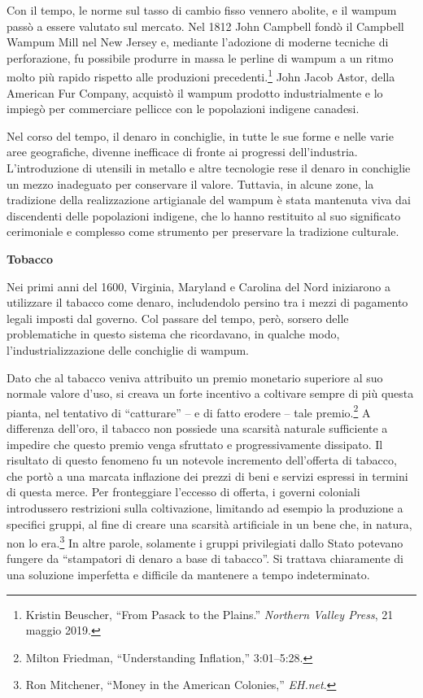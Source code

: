 \documentclass[
  a5paper,
  smalldemyvopaper,10pt,twoside,onecolumn,openright,extrafontsizes,hidelinks]{memoir}
\begin{document}
Con il tempo, le norme sul tasso di cambio fisso vennero abolite, e il
wampum passò a essere valutato sul mercato. Nel 1812 John Campbell fondò
il Campbell Wampum Mill nel New Jersey e, mediante l'adozione di moderne
tecniche di perforazione, fu possibile produrre in massa le perline di
wampum a un ritmo molto più rapido rispetto alle produzioni
precedenti.\footnote{Kristin Beuscher, ``From Pasack to the Plains.''
  \emph{Northern Valley Press}, 21 maggio 2019.} John Jacob Astor, della
American Fur Company, acquistò il wampum prodotto industrialmente e lo
impiegò per commerciare pellicce con le popolazioni indigene canadesi.

Nel corso del tempo, il denaro in conchiglie, in tutte le sue forme e
nelle varie aree geografiche, divenne inefficace di fronte ai progressi
dell'industria. L'introduzione di utensili in metallo e altre tecnologie
rese il denaro in conchiglie un mezzo inadeguato per conservare il
valore. Tuttavia, in alcune zone, la tradizione della realizzazione
artigianale del wampum è stata mantenuta viva dai discendenti delle
popolazioni indigene, che lo hanno restituito al suo significato
cerimoniale e complesso come strumento per preservare la tradizione
culturale.

\textbf{Tobacco}

Nei primi anni del 1600, Virginia, Maryland e Carolina del Nord
iniziarono a utilizzare il tabacco come denaro, includendolo persino tra
i mezzi di pagamento legali imposti dal governo. Col passare del tempo,
però, sorsero delle problematiche in questo sistema che ricordavano, in
qualche modo, l'industrializzazione delle conchiglie di wampum.

Dato che al tabacco veniva attribuito un premio monetario superiore al
suo normale valore d'uso, si creava un forte incentivo a coltivare
sempre di più questa pianta, nel tentativo di ``catturare'' -- e di
fatto erodere -- tale premio.\footnote{Milton Friedman, ``Understanding
  Inflation,'' 3:01--5:28.} A differenza dell'oro, il tabacco non
possiede una scarsità naturale sufficiente a impedire che questo premio
venga sfruttato e progressivamente dissipato. Il risultato di questo
fenomeno fu un notevole incremento dell'offerta di tabacco, che portò a
una marcata inflazione dei prezzi di beni e servizi espressi in termini
di questa merce. Per fronteggiare l'eccesso di offerta, i governi
coloniali introdussero restrizioni sulla coltivazione, limitando ad
esempio la produzione a specifici gruppi, al fine di creare una scarsità
artificiale in un bene che, in natura, non lo era.\footnote{Ron
  Mitchener, ``Money in the American Colonies,'' \emph{EH.net}.} In
altre parole, solamente i gruppi privilegiati dallo Stato potevano
fungere da ``stampatori di denaro a base di tabacco''. Si trattava
chiaramente di una soluzione imperfetta e difficile da mantenere a tempo
indeterminato.
\end{document}

